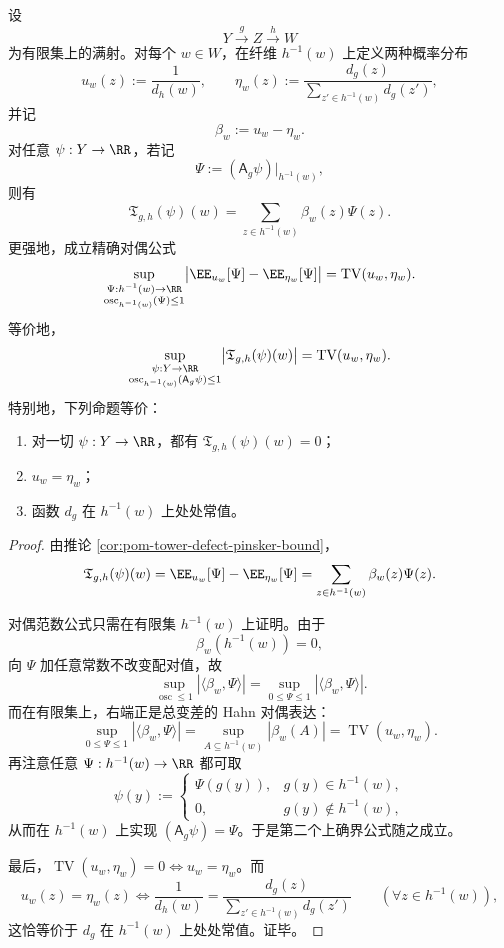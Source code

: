 \begin{theorem}\label{thm:conclusion-pom-tower-defect-exact-tv-duality}
设
\[
Y\xrightarrow{g} Z\xrightarrow{h} W
\]
为有限集上的满射。对每个 \(w\in W\)，在纤维 \(h^{-1}(w)\) 上定义两种概率分布
\[
u_w(z):=\frac{1}{d_h(w)},
\qquad
\eta_w(z):=\frac{d_g(z)}{\sum_{z'\in h^{-1}(w)}d_g(z')},
\]
并记
\[
\beta_w:=u_w-\eta_w.
\]
对任意 \(\psi:Y\to\RR\)，若记
\[
\Psi:=(\mathsf A_g\psi)\big|_{h^{-1}(w)},
\]
则有
\[
\mathfrak T_{g,h}(\psi)(w)
=
\sum_{z\in h^{-1}(w)}\beta_w(z)\Psi(z).
\]
更强地，成立精确对偶公式
\[
\sup_{\substack{\Psi:h^{-1}(w)\to\RR\\
\operatorname{osc}_{h^{-1}(w)}(\Psi)\le 1}}
\bigl|\EE_{u_w}[\Psi]-\EE_{\eta_w}[\Psi]\bigr|
=
\operatorname{TV}(u_w,\eta_w).
\]
等价地，
\[
\sup_{\substack{\psi:Y\to\RR\\
\operatorname{osc}_{h^{-1}(w)}(\mathsf A_g\psi)\le 1}}
\bigl|\mathfrak T_{g,h}(\psi)(w)\bigr|
=
\operatorname{TV}(u_w,\eta_w).
\]
特别地，下列命题等价：
\begin{enumerate}
  \item 对一切 \(\psi:Y\to\RR\)，都有 \(\mathfrak T_{g,h}(\psi)(w)=0\)；
  \item \(u_w=\eta_w\)；
  \item 函数 \(d_g\) 在 \(h^{-1}(w)\) 上处处常值。
\end{enumerate}
\end{theorem}
\begin{proof}
由推论 \ref{cor:pom-tower-defect-pinsker-bound}，
\[
\mathfrak T_{g,h}(\psi)(w)=\EE_{u_w}[\Psi]-\EE_{\eta_w}[\Psi]
=
\sum_{z\in h^{-1}(w)}\beta_w(z)\Psi(z).
\]

对偶范数公式只需在有限集 \(h^{-1}(w)\) 上证明。由于
\[
\beta_w(h^{-1}(w))=0,
\]
向 \(\Psi\) 加任意常数不改变配对值，故
\[
\sup_{\operatorname{osc}\le 1}|\langle \beta_w,\Psi\rangle|
=
\sup_{0\le \Psi\le 1}|\langle \beta_w,\Psi\rangle|.
\]
而在有限集上，右端正是总变差的 Hahn 对偶表达：
\[
\sup_{0\le \Psi\le 1}|\langle \beta_w,\Psi\rangle|
=
\sup_{A\subseteq h^{-1}(w)}|\beta_w(A)|
=
\operatorname{TV}(u_w,\eta_w).
\]
再注意任意 \(\Psi:h^{-1}(w)\to\RR\) 都可取
\[
\psi(y):=
\begin{cases}
\Psi(g(y)), & g(y)\in h^{-1}(w),\\
0, & g(y)\notin h^{-1}(w),
\end{cases}
\]
从而在 \(h^{-1}(w)\) 上实现 \((\mathsf A_g\psi)=\Psi\)。于是第二个上确界公式随之成立。

最后，\(\operatorname{TV}(u_w,\eta_w)=0\iff u_w=\eta_w\)。而
\[
u_w(z)=\eta_w(z)
\iff
\frac{1}{d_h(w)}
=
\frac{d_g(z)}{\sum_{z'\in h^{-1}(w)}d_g(z')}
\qquad(\forall z\in h^{-1}(w)),
\]
这恰等价于 \(d_g\) 在 \(h^{-1}(w)\) 上处处常值。证毕。
\end{proof}

